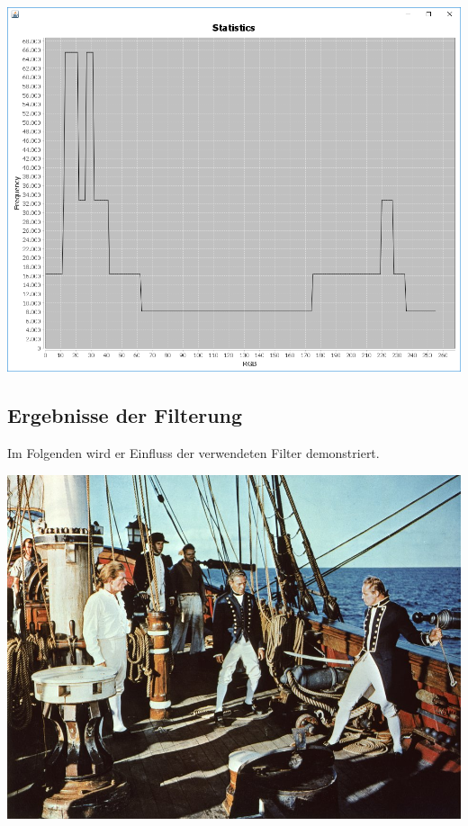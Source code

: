 \documentclass[a4paper,12pt]{article}
\begin{document}
\begin{center}
\includegraphics[width=0.8\linewidth,height=0.7\textheight]{Normalization/normalizedPowerOfTwo}
\end{center}
\newpage
\subsection{Ergebnisse der Filterung}
Im Folgenden wird er Einfluss der verwendeten Filter demonstriert. 
\par
\hspace{1.5cm}
\begin{center}
\includegraphics[width=0.8\linewidth,height=0.7\textheight]{Preconditioning/Bounty}
\end{center}
\end{document}
